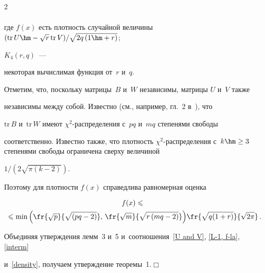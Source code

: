 \begin{multicols}{2}
\begin{multline}
\end{multline}


где $f(x)$ есть плотность случайной величины ${(\mathrm{tr}\,{U}\hm-


\sqrt{r}\,\mathrm{tr}\,{V})}/{\sqrt{2q\left(1\hm+r\right)}}$;


$K_{4}\left(r, q\right)$~--- 


некоторая вычислимая функция от~$r$ и~$q$.





Отметим, что, поскольку матрицы~$B$ и~$W$ независимы, матрицы $U$ и~$V$ также 


независимы между собой. Известно (см., например, гл.~2 в~\cite{lit:FUS01}), что 


$\mathrm{tr}\, B$ и~$\mathrm{tr}\, W$ имеют $\chi^{2}$-рас\-пре\-де\-ле\-ния с~$pq$ и~$mq$ степенями свободы 


соответственно. Известно также, что плотность $\chi^{2}$-распределения с~$k\hm\geq 3$ степенями свободы ограничена сверху величиной


$1/(2\sqrt{\pi\left(k-2\right)}).$


Поэтому для плотности $f(x)$ справедлива равномерная оценка


\begin{multline}


\label{density}


f(x) \leqslant{}\\


\hspace*{-1.5mm}{}\leqslant \min{\left( \fr{\sqrt{p}}{ \sqrt{ \left(pq-


2\right)}},\,\fr{\sqrt{m}}{\sqrt{r\left(mq-2\right)}}\right)} 


\fr{\sqrt{q(1+r)}}{\sqrt{2\pi}}\,.\!\!\!


\end{multline}


Объединяя утверждения лемм~3 и~5 и~соотношения~\eqref{U and V}, \eqref{L-1, f-la}, \eqref{interm} 


и~\eqref{density}, получаем утверждение теоремы~1.\hfill $\Box$%














\end{multicols}
